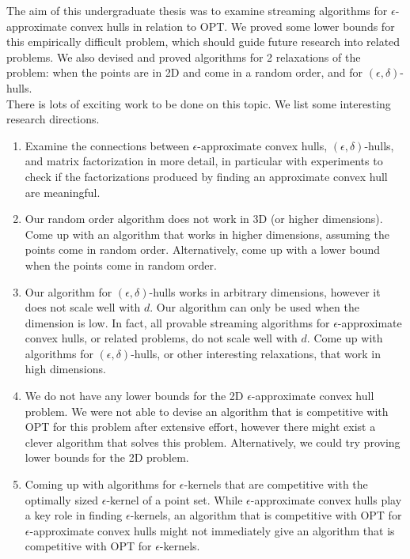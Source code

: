 The aim of this undergraduate thesis was to examine streaming algorithms for $\epsilon$-approximate convex hulls in relation to OPT. We proved some lower bounds for this empirically difficult problem, which should guide future research into related problems. We also devised and proved algorithms for 2 relaxations of the problem: when the points are in 2D and come in a random order, and for $(\epsilon,\delta)$-hulls.
\\

There is lots of exciting work to be done on this topic. We list some interesting research directions.
\begin{enumerate}
\item Examine the connections between $\epsilon$-approximate convex hulls, $(\epsilon, \delta)$-hulls, and matrix factorization in more detail, in particular with experiments to check if the factorizations produced by finding an approximate convex hull are meaningful.
\item Our random order algorithm does not work in 3D (or higher dimensions). Come up with an algorithm that works in higher dimensions, assuming the points come in random order. Alternatively, come up with a lower bound when the points come in random order.
\item Our algorithm for $(\epsilon, \delta)$-hulls works in arbitrary dimensions, however it does not scale well with $d$. Our algorithm can only be used when the dimension is low. In fact, all provable streaming algorithms for $\epsilon$-approximate convex hulls, or related problems, do not scale well with $d$. Come up with algorithms for $(\epsilon, \delta)$-hulls, or other interesting relaxations, that work in high dimensions.
\item We do not have any lower bounds for the 2D $\epsilon$-approximate convex hull problem. We were not able to devise an algorithm that is competitive with OPT for this problem after extensive effort, however there might exist a clever algorithm that solves this problem. Alternatively, we could try proving lower bounds for the 2D problem.
\item Coming up with algorithms for $\epsilon$-kernels that are competitive with the optimally sized $\epsilon$-kernel of a point set. While $\epsilon$-approximate convex hulls play a key role in finding $\epsilon$-kernels, an algorithm that is competitive with OPT for $\epsilon$-approximate convex hulls might not immediately give an algorithm that is competitive with OPT for $\epsilon$-kernels.
\end{enumerate} 